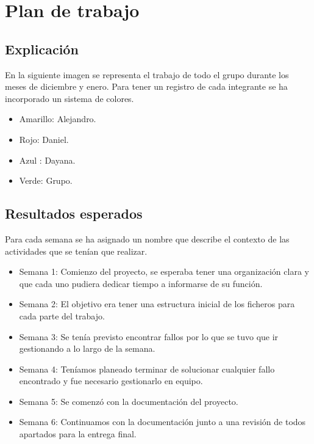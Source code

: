 \section{Plan de trabajo}
\subsection{Explicación}
En la siguiente imagen se representa el trabajo de todo el grupo durante los meses de diciembre y enero. Para tener un registro de cada integrante se ha incorporado un sistema de colores.

\begin{itemize}
     \item Amarillo: Alejandro.
     \item Rojo: Daniel.
     \item Azul : Dayana.
     \item Verde: Grupo.
\end{itemize}

\subsection{Resultados esperados}
Para cada semana se ha asignado un nombre que describe el contexto de las actividades que se tenían que realizar.

\begin{itemize}
     \item Semana 1: Comienzo del proyecto, se esperaba tener una organización clara y que cada uno pudiera dedicar tiempo a informarse de su función.
     \item Semana 2: El objetivo era tener una estructura inicial de los ficheros para cada parte del trabajo.
     \item Semana 3: Se tenía previsto encontrar fallos por lo que se tuvo que ir gestionando a lo largo de la semana.
     \item Semana 4: Teníamos planeado terminar de solucionar cualquier fallo encontrado y fue necesario gestionarlo en equipo.
     \item Semana 5: Se comenzó con la documentación del proyecto.
     \item Semana 6: Continuamos con la documentación junto a una revisión de todos apartados para la entrega final.
\end{itemize}



